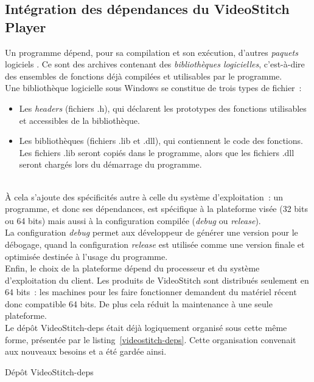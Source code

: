 \subsection{Intégration des dépendances du VideoStitch Player}
\label{integration-dependances-player}
Un programme dépend, pour sa compilation et son exécution, d'autres \emph{paquets} logiciels
\cite{dependance-logicielle}. Ce sont des archives contenant des \emph{bibliothèques logicielles},
c'est-à-dire des ensembles de fonctions déjà compilées et utilisables par le programme.\\
Une bibliothèque logicielle sous Windows se constitue de trois types de fichier\cite{bibliotheque-logicielle}~:
\begin{itemize}
  \item Les \textit{headers} (fichiers .h), qui déclarent les prototypes des fonctions utilisables
  et accessibles de la bibliothèque.
  \item Les bibliothèques (fichiers .lib et .dll), qui contiennent le code des fonctions.
  Les fichiers .lib seront copiés dans le programme, alors que les fichiers .dll seront
  chargés lors du démarrage du programme\cite{bibliotheque-logicielle}.
\end{itemize}
\ \\
À cela s'ajoute des spécificités autre à celle du système d'exploitation~: un programme, et donc
ses dépendances, est spécifique à la plateforme visée (32 bits ou 64 bits)\cite{64-bit-computing}
mais aussi à la configuration compilée (\textit{debug} ou \textit{release})\cite{msdn-debug-release}.\\
La configuration \textit{debug} permet aux développeur de générer une version pour le débogage,
quand la configuration \textit{release} est utilisée comme une version finale et optimisée destinée
à l'usage du programme.\\
Enfin, le choix de la plateforme dépend du processeur et du
système d'exploitation du client. Les produits de VideoStitch sont distribués
seulement en 64 bits~: les machines pour les faire fonctionner demandent du matériel
récent donc compatible 64 bits. De plus cela réduit la maintenance à une seule plateforme.\\
\newline
Le dépôt VideoStitch-deps était déjà logiquement organisé sous cette même forme,
présentée par le listing~\ref{videostitch-deps}.
Cette organisation convenait aux nouveaux besoins et a été gardée ainsi. 
\begin{listing}
  \caption{Dépôt VideoStitch-deps}
  \label{videostitch-deps}
\end{listing}
